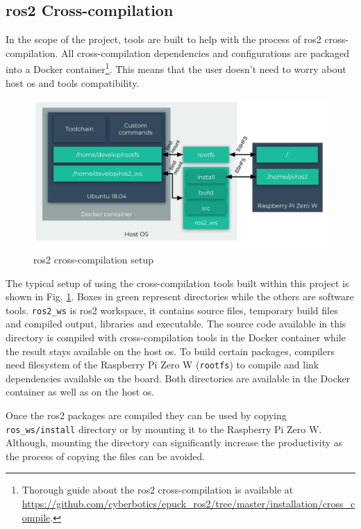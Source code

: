 \subsection{\ac{ros2} Cross-compilation}
In the scope of the project, tools are built to help with the process of \ac{ros2} cross-compilation.
All cross-compilation dependencies and configurations are packaged into a Docker container\footnote{Thorough guide about the \ac{ros2} cross-compilation is available at \url{https://github.com/cyberbotics/epuck_ros2/tree/master/installation/cross_compile}.}.
This means that the user doesn't need to worry about host \ac{os} and tools compatibility. 

\begin{figure}[H]
    \centering
    \includegraphics[width=\textwidth]{physical/figures/cross_compilation.pdf}
    \caption{\ac{ros2} cross-compilation setup}
    \label{fig:physical:cross_compilation}
\end{figure}

The typical setup of using the cross-compilation tools built within this project is shown in Fig. \ref{fig:physical:cross_compilation}.
Boxes in green represent directories while the others are software tools.
\texttt{ros2\_ws} is \ac{ros2} workspace, it contains source files, temporary build files and compiled output, libraries and executable.
The source code available in this directory is compiled with cross-compilation tools in the Docker container while the result stays available on the host \ac{os}.
To build certain packages, compilers need filesystem of the Raspberry Pi Zero W (\texttt{rootfs}) to compile and link dependencies available on the board.
Both directories are available in the Docker container as well as on the host \ac{os}.

Once the \ac{ros2} packages are compiled they can be used by copying \texttt{ros\_ws/install} directory or by mounting it to the Raspberry Pi Zero W.
Although, mounting the directory can significantly increase the productivity as the process of copying the files can be avoided.

